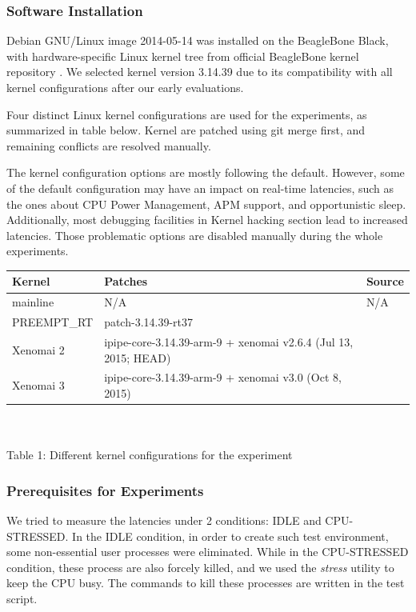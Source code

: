 \documentclass[10pt,a4paper]{article}
\begin{document}
\begin{multicols}{2}
\subsubsection{Software Installation}
Debian GNU/Linux image 2014-05-14 \cite{debian} was installed on the BeagleBone Black, with hardware-specific Linux kernel tree from official BeagleBone kernel repository \cite{kernel}. We selected kernel version 3.14.39 due to its compatibility with all kernel configurations after our early evaluations.

Four distinct Linux kernel configurations are used for the experiments, as summarized in table below. Kernel are patched using git merge first, and remaining conflicts are resolved manually.

The kernel conﬁguration options are mostly following the default. However, some of the default configuration may have an impact on real-time latencies, such as the ones about CPU Power Management, APM support, and opportunistic sleep. Additionally, most debugging facilities in Kernel hacking section lead to increased latencies. Those problematic options are disabled manually during the whole experiments.

\begin{tabular}{|l| p{3cm} |l|}
\hline
Kernel & Patches & Source\\ \hline
mainline   & N/A & N/A \\ \hline
PREEMPT\_RT & patch-3.14.39-rt37 & \cite{p-rt} \\ \hline
Xenomai 2  & ipipe-core-3.14.39-arm-9 + xenomai v2.6.4 (Jul 13, 2015; HEAD) & \cite{p-ipipe} \cite{git-x2.6} \\ \hline
Xenomai 3  & ipipe-core-3.14.39-arm-9 + xenomai v3.0 (Oct 8, 2015) & \cite{p-ipipe} \cite{git-x3} \\ \hline
\end{tabular}\\
\vspace{4mm} \\
Table 1: Different kernel configurations for the experiment\\

\subsubsection{Prerequisites for Experiments}
We tried to measure the latencies under 2 conditions: IDLE and CPU-STRESSED. In the IDLE condition, in order to create such test environment, some non-essential user processes were eliminated. While in the CPU-STRESSED condition, these process are also forcely killed, and we used the \textit{stress} \cite{stress} utility to keep the CPU busy. The commands to kill these processes are written in the test script.


\end{multicols}
\end{document}
